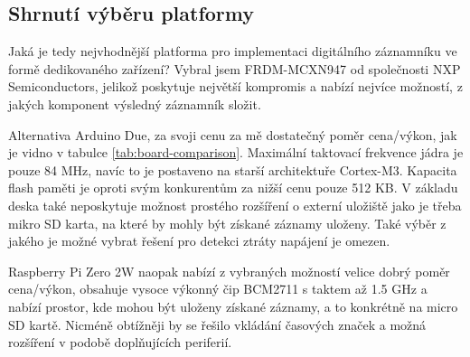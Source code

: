 \subsection{Shrnutí výběru platformy}
Jaká je tedy nejvhodnější platforma pro implementaci digitálního záznamníku ve formě dedikovaného zařízení? Vybral jsem FRDM-MCXN947 od společnosti NXP Semiconductors, jelikož poskytuje největší kompromis a nabízí nejvíce možností, z jakých komponent výsledný záznamník složit.

Alternativa Arduino Due, za svoji cenu za mě dostatečný poměr cena/výkon, jak je vidno v tabulce \ref{tab:board-comparison}. Maximální taktovací frekvence jádra je pouze 84 MHz, navíc to je postaveno na starší architektuře Cortex-M3. Kapacita flash paměti je oproti svým konkurentům za nižší cenu pouze 512 KB. V základu deska také neposkytuje možnost prostého rozšíření o externí uložiště jako je třeba mikro SD karta, na které by mohly být získané záznamy uloženy. Také výběr z jakého je možné vybrat řešení pro detekci ztráty napájení je omezen.

Raspberry Pi Zero 2W naopak nabízí z vybraných možností velice dobrý poměr cena/výkon, obsahuje vysoce výkonný čip BCM2711 s taktem až 1.5 GHz a nabízí prostor, kde mohou být uloženy získané záznamy, a to konkrétně na micro SD kartě. Nicméně obtížněji by se řešilo vkládání časových značek a možná rozšíření v podobě doplňujících periferií.

